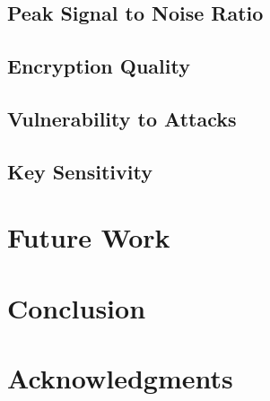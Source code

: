 \documentclass[conference]{IEEEtran}
\begin{document}
\subsection{Peak Signal to Noise Ratio}\label{subsec:peak-signal-to-noise-ratio}

\subsection{Encryption Quality}\label{subsec:encryption-quality}

\subsection{Vulnerability to Attacks}\label{subsec:vulnerability-to-attacks}

\subsection{Key Sensitivity}\label{subsec:key-sensitivity}

\section{Future Work}\label{sec:future-work}

\section{Conclusion}\label{sec:conclusion}

\section{Acknowledgments}\label{sec:acknowledgments}



\end{document}
